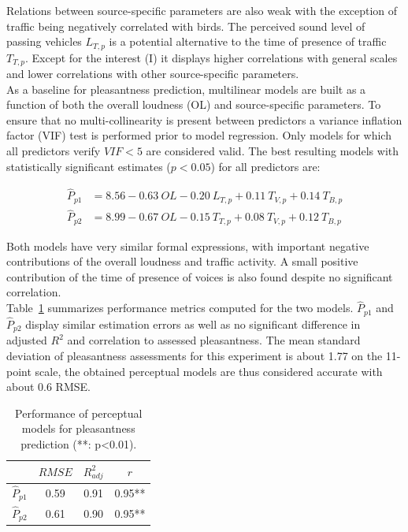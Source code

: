 \documentclass[11pt,a4paper]{article}
\begin{document}
Relations between source-specific parameters are also weak with the exception of traffic being negatively correlated with birds. The perceived sound level of passing vehicles $L_{T, p}$ is a potential alternative to the time of presence of traffic $T_{T, p}$. Except for the interest (I) it displays higher correlations with general scales and lower correlations with other source-specific parameters.\\

As a baseline for pleasantness prediction, multilinear models are built as a function of both the overall loudness (OL) and source-specific parameters. To ensure that no multi-collinearity is present between predictors a variance inflation factor (VIF) test is performed prior to model regression. Only models for which all predictors verify $VIF<5$ are considered valid. The best resulting models with statistically significant estimates ($p<0.05$) for all predictors are:

\begin{align}
\hat P_{p1} &= 8.56 - 0.63~OL - 0.20~L_{T, p} + 0.11~T_{V, p} + 0.14~T_{B, p}\\
\hat P_{p2} &= 8.99 - 0.67~OL - 0.15~T_{T, p} + 0.08~T_{V, p} + 0.12~T_{B, p}
\end{align}

Both models have very similar formal expressions, with important negative contributions of the overall loudness and traffic activity. A small positive contribution of the time of presence of voices is also found despite no significant correlation.\\

Table~\ref{tab:percm} summarizes performance metrics computed for the two models. $\hat P_{p1}$ and $\hat P_{p2}$ display similar estimation errors as well as no significant difference in adjusted $R^2$ and correlation to assessed pleasantness. The mean standard deviation of pleasantness assessments for this experiment is about 1.77 on the 11-point scale, the obtained perceptual models are thus considered accurate with about 0.6 RMSE.

\begin{table}[t]
\centering
\caption{Performance of perceptual models for pleasantness prediction (**: p<0.01).}
\label{tab:percm}
\begin{tabular}{ c | c | c | c }
\hline
	 & $RMSE$ & $R^2_{adj}$ & $r$ \\ \hline
	$\hat P_{p1}$ & 0.59 & 0.91 & 0.95** \\
	$\hat P_{p2}$ & 0.61 & 0.90 & 0.95** \\ \hline
\end{tabular}
\end{table}
\end{document}
